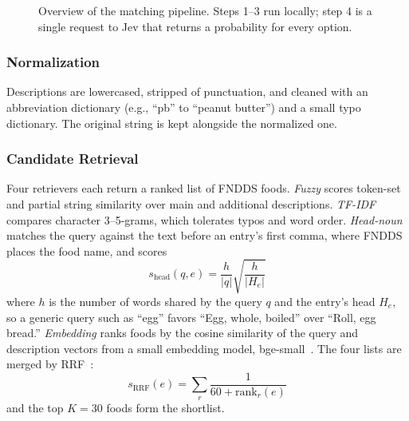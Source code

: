 \documentclass[11pt,journal,onecolumn]{IEEEtran}
\begin{document}
\begin{figure}[!tb]
\centering
{}
\caption{Overview of the matching pipeline. Steps 1--3 run locally; step 4 is a single request to Jev that returns a probability for every option.}
\label{fig:pipeline}
\end{figure}

\subsubsection{Normalization}
Descriptions are lowercased, stripped of punctuation, and cleaned with an abbreviation dictionary (e.g., ``pb'' to ``peanut butter'') and a small typo dictionary. The original string is kept alongside the normalized one.

\subsubsection{Candidate Retrieval}
Four retrievers each return a ranked list of FNDDS foods. \emph{Fuzzy} scores token-set and partial string similarity over main and additional descriptions. \emph{TF-IDF} compares character 3--5-grams, which tolerates typos and word order. \emph{Head-noun} matches the query against the text before an entry's first comma, where FNDDS places the food name, and scores
\begin{equation}
s_{\mathrm{head}}(q,e)=\frac{h}{|q|}\sqrt{\frac{h}{|H_e|}}
\end{equation}
where $h$ is the number of words shared by the query $q$ and the entry's head $H_e$, so a generic query such as ``egg'' favors ``Egg, whole, boiled'' over ``Roll, egg bread.'' \emph{Embedding} ranks foods by the cosine similarity of the query and description vectors from a small embedding model, bge-small~\cite{bge}. The four lists are merged by RRF~\cite{rrf}:
\begin{equation}
s_{\mathrm{RRF}}(e)=\sum_{r}\frac{1}{60+\mathrm{rank}_r(e)}
\end{equation}
and the top $K=30$ foods form the shortlist.
\end{document}
